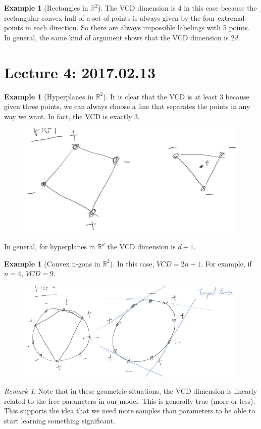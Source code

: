 \documentclass[12pt, letterpaper]{article}
\numberwithin{equation}{section} %
\newcommand{\R}{\mathbb{R}}
\theoremstyle{definition}
\newtheorem{example}[theorem]{Example}
\theoremstyle{remark}
\newtheorem{remark}[theorem]{Remark}
\begin{document}
\begin{example}[Rectangles in $\R^2$]
    The VCD dimension is $4$ in this case because the rectangular convex hull of a set of points is always given by the four extremal points in each direction. So there are always impossible labelings with 5 points. In general, the same kind of argument shows that the VCD dimension is $2d$.
\end{example}


\section{Lecture 4: 2017.02.13}

\begin{example}[Hyperplanes in $\R^2$]
    It is clear that the VCD is at least 3 because given three points, we can always choose a line that separates the points in any way we want. In fact, the VCD is exactly 3.
    \begin{figure}[H]
    \centering
    \includegraphics[width=0.3\linewidth]{img/hyperplanes.png}
    \end{figure}
    In general, for hyperplanes in $\R^d$ the VCD dimension is $d+1$.
\end{example}

\begin{example}[Convex n-gons in $\R^2$]
    In this case, $VCD = 2n+1$. For example, if $n=4$, $VCD = 9$.
    \begin{figure}[H]
    \centering
    \includegraphics[width=0.3\linewidth]{img/4-gons.png}
    \end{figure}
\end{example}

\begin{remark}
    Note that in these geometric situations, the VCD dimension is linearly related to the free parameters in our model. This is generally true (more or less). This supports the idea that we need more samples than parameters to be able to start learning something significant.
\end{remark}
\end{document}
